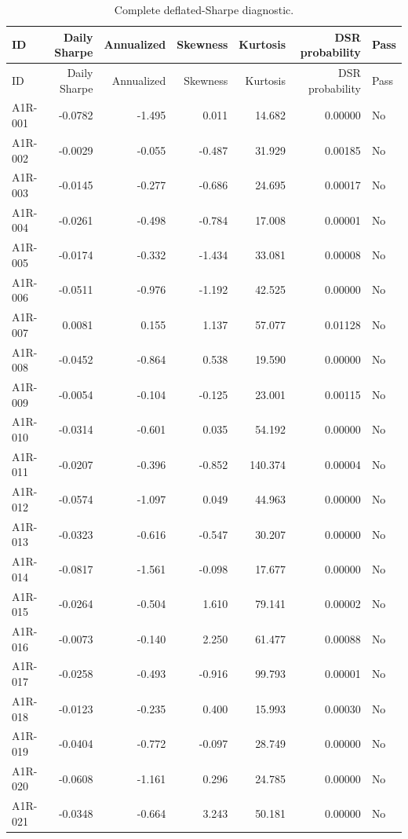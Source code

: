 \begingroup\scriptsize\setlength{\tabcolsep}{2.5pt}
\begin{longtable}{lrrrrrl}
\caption{Complete deflated-Sharpe diagnostic.}\label{tab:s_dsr}\\
\toprule ID & Daily Sharpe & Annualized & Skewness & Kurtosis & DSR probability & Pass \\
\midrule\endfirsthead
\toprule ID & Daily Sharpe & Annualized & Skewness & Kurtosis & DSR probability & Pass \\
\midrule\endhead
A1R-001 & -0.0782 & -1.495 & 0.011 & 14.682 & 0.00000 & No \\
A1R-002 & -0.0029 & -0.055 & -0.487 & 31.929 & 0.00185 & No \\
A1R-003 & -0.0145 & -0.277 & -0.686 & 24.695 & 0.00017 & No \\
A1R-004 & -0.0261 & -0.498 & -0.784 & 17.008 & 0.00001 & No \\
A1R-005 & -0.0174 & -0.332 & -1.434 & 33.081 & 0.00008 & No \\
A1R-006 & -0.0511 & -0.976 & -1.192 & 42.525 & 0.00000 & No \\
A1R-007 & 0.0081 & 0.155 & 1.137 & 57.077 & 0.01128 & No \\
A1R-008 & -0.0452 & -0.864 & 0.538 & 19.590 & 0.00000 & No \\
A1R-009 & -0.0054 & -0.104 & -0.125 & 23.001 & 0.00115 & No \\
A1R-010 & -0.0314 & -0.601 & 0.035 & 54.192 & 0.00000 & No \\
A1R-011 & -0.0207 & -0.396 & -0.852 & 140.374 & 0.00004 & No \\
A1R-012 & -0.0574 & -1.097 & 0.049 & 44.963 & 0.00000 & No \\
A1R-013 & -0.0323 & -0.616 & -0.547 & 30.207 & 0.00000 & No \\
A1R-014 & -0.0817 & -1.561 & -0.098 & 17.677 & 0.00000 & No \\
A1R-015 & -0.0264 & -0.504 & 1.610 & 79.141 & 0.00002 & No \\
A1R-016 & -0.0073 & -0.140 & 2.250 & 61.477 & 0.00088 & No \\
A1R-017 & -0.0258 & -0.493 & -0.916 & 99.793 & 0.00001 & No \\
A1R-018 & -0.0123 & -0.235 & 0.400 & 15.993 & 0.00030 & No \\
A1R-019 & -0.0404 & -0.772 & -0.097 & 28.749 & 0.00000 & No \\
A1R-020 & -0.0608 & -1.161 & 0.296 & 24.785 & 0.00000 & No \\
A1R-021 & -0.0348 & -0.664 & 3.243 & 50.181 & 0.00000 & No \\

\end{longtable}
